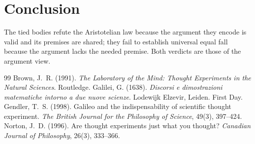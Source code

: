 \documentclass{situationist-preprint}
\begin{document}
\section{Conclusion}

The tied bodies refute the Aristotelian law because the argument they encode is valid and its premises are shared; they fail to establish universal equal fall because the argument lacks the needed premise. Both verdicts are those of the argument view.

\begin{thebibliography}{99}\small
{} Brown, J.~R. (1991). \emph{The Laboratory of the Mind: Thought Experiments in the Natural Sciences}. Routledge.
 Galilei, G. (1638). \emph{Discorsi e dimostrazioni matematiche intorno a due nuove scienze}. Lodewijk Elzevir, Leiden. First Day.
 Gendler, T.~S. (1998). Galileo and the indispensability of scientific thought experiment. \emph{The British Journal for the Philosophy of Science}, 49(3), 397--424.
 Norton, J.~D. (1996). Are thought experiments just what you thought? \emph{Canadian Journal of Philosophy}, 26(3), 333--366.
\end{thebibliography}
\end{document}
